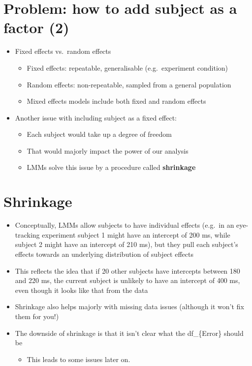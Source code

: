 \documentclass[]{article}
\begin{document}
\section{Problem: how to add subject as a factor
(2)}\label{problem-how-to-add-subject-as-a-factor-2}

\begin{itemize}
\itemsep1pt\parskip0pt
\item
  Fixed effects vs.~random effects

  \begin{itemize}
  \itemsep1pt\parskip0pt
  \item
    Fixed effects: repeatable, generalisable (e.g.~experiment condition)
  \item
    Random effects: non-repeatable, sampled from a general population
  \item
    Mixed effects models include both fixed and random effects
  \end{itemize}
\item
  Another issue with including subject as a fixed effect:

  \begin{itemize}
  \itemsep1pt\parskip0pt
  \item
    Each subject would take up a degree of freedom
  \item
    That would majorly impact the power of our analysis
  \item
    LMMs solve this issue by a procedure called \textbf{shrinkage}
  \end{itemize}
\end{itemize}

\section{Shrinkage}\label{shrinkage}

\begin{itemize}
\itemsep1pt\parskip0pt
\item
  Conceptually, LMMs allow subjects to have individual effects (e.g.~in
  an eye-tracking experiment subject 1 might have an intercept of 200
  ms, while subject 2 might have an intercept of 210 ms), but they pull
  each subject's effects towards an underlying distribution of subject
  effects
\item
  This reflects the idea that if 20 other subjects have intercepts
  between 180 and 220 ms, the current subject is unlikely to have an
  intercept of 400 ms, even though it looks like that from the data
\item
  Shrinkage also helps majorly with missing data issues (although it
  won't fix them for you!)
\item
  The downside of shrinkage is that it isn't clear what the
  df\_\{Error\} should be

  \begin{itemize}
  \itemsep1pt\parskip0pt
  \item
    This leads to some issues later on.
  \end{itemize}
\end{itemize}
\end{document}
